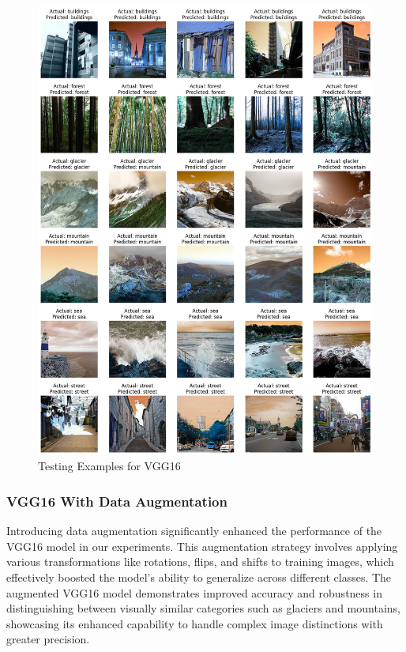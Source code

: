 \documentclass[conference]{IEEEtran}
\begin{document}
\begin{figure}[H]
    \centering
    \includegraphics[width=1\linewidth]{images//VGG16/ExamplesVGG16.png}
    \caption{Testing Examples for VGG16}
    \label{fig:ExamplesVGG16}
\end{figure}

\subsubsection{VGG16 With Data Augmentation}

Introducing data augmentation significantly enhanced the performance of the VGG16 model in our experiments. This augmentation strategy involves applying various transformations like rotations, flips, and shifts to training images, which effectively boosted the model's ability to generalize across different classes. The augmented VGG16 model demonstrates improved accuracy and robustness in distinguishing between visually similar categories such as glaciers and mountains, showcasing its enhanced capability to handle complex image distinctions with greater precision.
\end{document}
